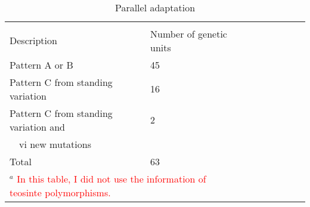 \renewcommand{\arraystretch}{1.1}
\begin{table}[tb]

\begin{center}
 \caption[]{Parallel adaptation\hspace*{0.3cm}}
  \textbf{}\\[-2mm]
{\fontsize{7}{11}\sf
    \begin{tabular}{lllcccccl} \hline
       & & \\[-3mm]
     Description  & Number of genetic units\\[0.1cm]
    \hline
Pattern A or B     & 45 \\
Pattern C from standing variation & 16\\ 
Pattern C from standing variation and & 2\\
\ \ vi new mutations & \\
Total & 63\\[1mm]
    \hline
  \multicolumn{2}{l}{$^{a}$ \textcolor{red}{In this table, I did not use the information of teosinte polymorphisms.}}\\
    \end{tabular}
    \label{paraGU}  %
}
\end{center}
\end{table}
\renewcommand{\arraystretch}{1}


